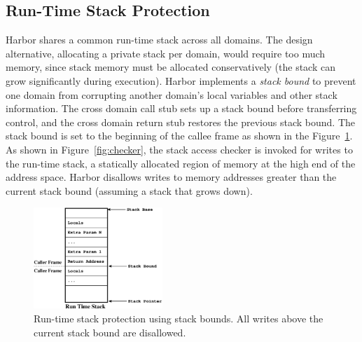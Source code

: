\subsection{Run-Time Stack Protection}
\label{subsec:stackguard}
%

Harbor shares a common run-time stack across all domains.
%
The design alternative, allocating a private stack per domain,
%
would require too much memory, since stack memory must be allocated
conservatively (the stack can grow significantly during execution).
%
%
%
Harbor implements a \emph{stack bound} to prevent one domain from
corrupting another domain's local variables and other stack
information.
%
The cross domain call stub sets up a stack bound before transferring
control, and the cross domain return stub restores the previous stack
bound.
%
The stack bound is set to the beginning of the callee frame as shown
in the Figure~\ref{fig:stackbound}.
%
As shown in Figure~\ref{fig:checker}, the stack access checker is invoked
for writes to the run-time stack, a statically allocated region of memory
at the high end of the address space.
%
Harbor disallows writes to memory addresses greater than the current stack
bound (assuming a stack that grows down).
%
%
%
\begin{figure}[htbp]
   \centering
   \includegraphics[height=1.5in, keepaspectratio=true]{figures/stack_bounds.eps} 
   \caption[Run-time stack protection using stack bounds]{Run-time stack protection using stack bounds. All writes
     above the current stack bound are disallowed.}
   \label{fig:stackbound}
\end{figure}


